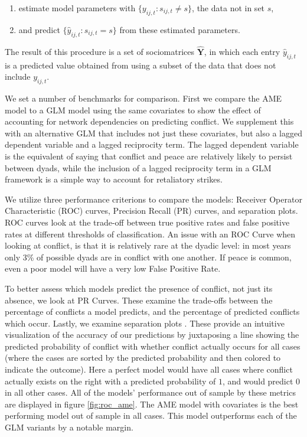 \begin{enumerate}
	\item estimate model parameters with $\{y_{ij,t}: s_{ij,t} \neq s\}$, the data not in set $s$,
	\item and predict $\{\hat{y}_{ij,t}: s_{ij,t} = s\}$ from these estimated parameters. 
\end{enumerate}

\noindent The result of this procedure is a set of sociomatrices $\bm \hat Y$, in which each entry $\hat y_{ij,t}$ is a predicted value obtained from using a subset of the data that does not include $y_{ij,t}$. 

We set a number of benchmarks for comparison. First we compare the AME model to a GLM model using the same covariates to show the effect of accounting for network dependencies on predicting conflict. We supplement this with an alternative GLM that includes not just these covariates, but also a lagged dependent variable and a lagged reciprocity term. The lagged dependent variable is the equivalent of saying that conflict and peace are relatively likely to persist between dyads, while the inclusion of a lagged reciprocity term in a GLM framework is a simple way to account for retaliatory strikes.

We utilize three performance criterions to compare the models: Receiver Operator Characteristic (ROC) curves, Precision Recall (PR) curves, and separation plots. ROC curves look at the trade-off between true positive rates and false positive rates at different thresholds of classification. An issue with an ROC Curve when looking at conflict, is that it is relatively rare at the dyadic level: in most years only 3\% of possible dyads are in conflict with one another. If peace is common, even a poor model will have a very low False Positive Rate. 

To better assess which models predict the presence of conflict, not just its absence, we look at PR Curves. These examine the trade-offs between the percentage of conflicts a model predicts, and the percentage of predicted conflicts which occur. Lastly, we examine separation plots \citep{greenhill:etal:2011}. These provide an intuitive visualization of the accuracy of our predictions by juxtaposing a line showing the predicted probability of conflict with whether conflict actually occurs for all cases (where the cases are sorted by the predicted probability and then colored to indicate the outcome). Here a perfect model would have all cases where conflict actually exists on the right with a predicted probability of $1$, and would predict $0$ in all other cases. All of the models' performance out of sample by these metrics are displayed in figure \ref{fig:roc_ame}. The AME model with covariates is the best performing model out of sample in all cases. This model outperforms each of the GLM variants by a notable margin.

